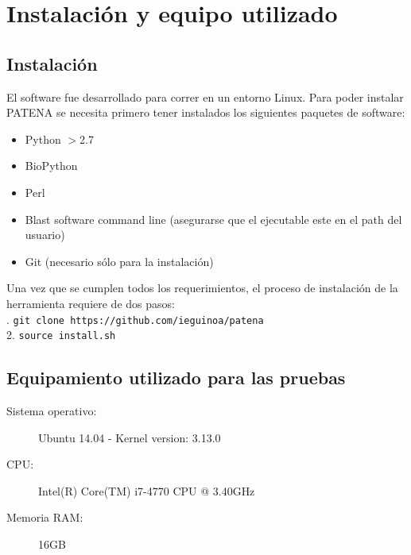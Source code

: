 \chapter{Instalación y equipo utilizado}\label{equipo}

\section{Instalación}\label{install}

El software fue desarrollado para correr en un entorno Linux.
Para poder instalar PATENA se necesita primero tener instalados los siguientes paquetes de software:

\begin{itemize}
 \item Python $>$2.7 \cite{python}
 \item BioPython \cite{biopython}
 \item Perl \cite{perl}
 \item Blast software command line \cite{blastLocal} (asegurarse que el ejecutable este en el path del usuario)
 \item Git \cite{git} (necesario sólo para la instalación)
\end{itemize}

Una vez que se cumplen todos los requerimientos, el proceso de instalación de la herramienta requiere de dos pasos: \\ 

. \hspace{0.5cm} \texttt{git clone https://github.com/ieguinoa/patena}\\
2. \hspace{0.5cm} \texttt{source install.sh}


\section{Equipamiento utilizado para las pruebas}\label{equipamiento}


\begin{center}
\begin{description}
 \item[Sistema operativo:] Ubuntu 14.04 - Kernel version: 3.13.0
\item[CPU:] Intel(R) Core(TM) i7-4770 CPU @ 3.40GHz
\item[Memoria RAM:] 16GB
\end{description}
\end{center}


